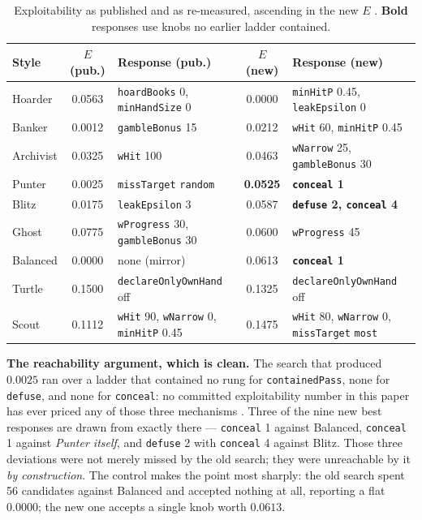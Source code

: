 \documentclass[11pt]{article}
\newcommand{\code}[1]{\texttt{#1}}
\begin{document}
\begin{table}[t]
\centering
\caption{Exploitability as published and as re-measured, ascending in the new $E$
\cite{artifact,artifactv2b}. \textbf{Bold} responses use knobs no earlier ladder contained.}
\label{tab:addexploit}
\footnotesize
\begin{tabular}{@{}lclcl@{}}
\toprule
Style & $E$ (pub.) & Response (pub.) & $E$ (new) & Response (new) \\
\midrule
Hoarder   & 0.0563 & \code{hoardBooks} 0, \code{minHandSize} 0 & 0.0000 &
  \code{minHitP} 0.45, \code{leakEpsilon} 0 \\
Banker    & 0.0012 & \code{gambleBonus} 15 & 0.0212 & \code{wHit} 60, \code{minHitP} 0.45 \\
Archivist & 0.0325 & \code{wHit} 100 & 0.0463 & \code{wNarrow} 25, \code{gambleBonus} 30 \\
Punter    & 0.0025 & \code{missTarget} \code{random} & \textbf{0.0525} &
  \textbf{\code{conceal} 1} \\
Blitz     & 0.0175 & \code{leakEpsilon} 3 & 0.0587 &
  \textbf{\code{defuse} 2, \code{conceal} 4} \\
Ghost     & 0.0775 & \code{wProgress} 30, \code{gambleBonus} 30 & 0.0600 &
  \code{wProgress} 45 \\
Balanced  & 0.0000 & none (mirror) & 0.0613 & \textbf{\code{conceal} 1} \\
Turtle    & 0.1500 & \code{declareOnlyOwnHand} off & 0.1325 &
  \code{declareOnlyOwnHand} off \\
Scout     & 0.1112 & \code{wHit} 90, \code{wNarrow} 0, \code{minHitP} 0.45 & 0.1475 &
  \code{wHit} 80, \code{wNarrow} 0, \code{missTarget} \code{most} \\
\bottomrule
\end{tabular}
\end{table}

\textbf{The reachability argument, which is clean.} The search that produced $0.0025$ ran over
a ladder that contained no rung for \code{containedPass}, none for \code{defuse}, and none for
\code{conceal}: no committed exploitability number in this paper has ever priced any of those
three mechanisms \cite{exploitladder}. Three of the nine new best responses are drawn from
exactly there --- \code{conceal} 1 against Balanced, \code{conceal} 1 against \emph{Punter
itself}, and \code{defuse} 2 with \code{conceal} 4 against Blitz. Those three deviations were
not merely missed by the old search; they were unreachable by it \emph{by construction}. The
control makes the point most sharply: the old search spent 56 candidates against Balanced and
accepted nothing at all, reporting a flat $0.0000$; the new one accepts a single knob worth
$0.0613$.
\end{document}
